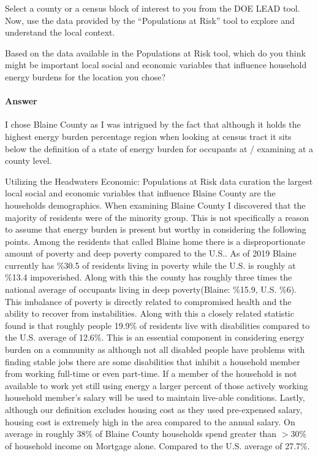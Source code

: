 \documentclass{article}
\begin{document}
Select a county or a census block of interest to you from the DOE LEAD tool.
Now, use the data provided by the “Populations at Risk” tool to explore and
understand the local context.


Based on the data available in the Populations at Risk tool, which do you think
might be important local social and economic variables that influence household
energy burdens for the location you chose?

\paragraph{Answer}

I chose Blaine County as I was intrigued by the fact that although it holds
the highest energy burden percentage region when looking at census tract it sits
below the definition of a state of energy burden for occupants at /%
examining at a county level.

Utilizing the Headwaters Economic: Populations at Risk data curation the
largest local social and economic variables that influence Blaine County are
the households demographics. When examining Blaine County I discovered that
the majority of residents were of the minority group. This is not specifically
a reason to assume that energy burden is present but worthy in considering the
following points. Among the residents that called Blaine home there is a
disproportionate amount of poverty and deep poverty compared to the U.S..
As of 2019 Blaine currently has \%30.5 of residents living in poverty while the
U.S. is roughly at \%13.4 impoverished. Along with this the county has roughly
three times the national average of occupants living in deep poverty(Blaine:
\%15.9, U.S. \%6). This imbalance of poverty is directly related to compromised
health and the ability to recover from instabilities. Along with this a closely
related statistic found is that roughly people 19.9\% of residents live
with disabilities compared to the U.S. average of 12.6\%. This is an essential
component in considering energy burden on a community as although not all
disabled people have problems with finding stable jobs there are some disabilities
that inhibit a household member from working full-time or even part-time. If a
member of the household is not available to work yet still using energy a larger
percent of those actively working household member's salary will be used to maintain
live-able conditions. Lastly, although our definition excludes housing cost as
they used pre-expensed salary, housing cost is extremely high in the area compared
to the annual salary. On average in roughly 38\% of Blaine County households
spend greater than $>30\%$ of household income on Mortgage alone. Compared to the
U.S. average of 27.7\%.
\end{document}
